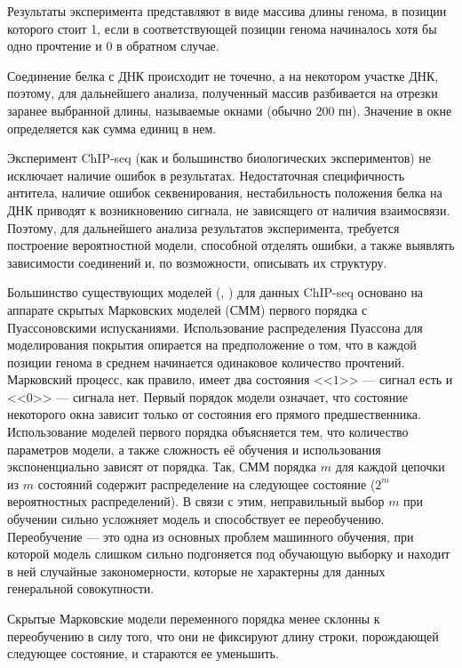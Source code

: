 \documentclass{matmex-diploma-custom}
\begin{document}
Результаты эксперимента представляют в виде массива длины генома, в позиции которого стоит 1, если в соответствующей позиции генома начиналось хотя бы одно прочтение
и 0 в обратном случае.

Соединение белка с ДНК происходит не точечно, а на некотором участке ДНК, поэтому, для дальнейшего анализа, полученный массив разбивается на отрезки заранее выбранной длины, называемые окнами (обычно 200 пн). Значение в окне определяется как сумма единиц в нем. 

Эксперимент ChIP-seq (как и большинство биологических
экспериментов) не исключает наличие ошибок в результатах. Недостаточная специфичность антитела, наличие ошибок секвенирования, нестабильность положения белка на ДНК приводят к возникновению сигнала, не
зависящего от наличия взаимосвязи.
Поэтому, для дальнейшего анализа результатов эксперимента, требуется построение вероятностной модели, способной отделять ошибки, а также 
выявлять зависимости соединений и, по возможности, описывать их структуру.

Большинство существующих моделей (\cite{Zhang2008}, \cite{Spyrou2009}) для данных
ChIP-seq основано на аппарате скрытых Марковских моделей (СММ) 
первого порядка \cite{Rabiner1989} с Пуассоновскими испусканиями. Использование распределения
Пуассона для моделирования покрытия опирается на предположение о том, что в каждой
позиции генома в среднем начинается одинаковое количество прочтений.
Марковский процесс, как правило, имеет два состояния <<$1$>> --- сигнал есть и <<$0$>> --- сигнала нет. Первый порядок модели означает, что состояние некоторого окна зависит только от состояния его прямого предшественника.
Использование моделей первого порядка объясняется тем, что количество параметров
модели, а также сложность её обучения и использования экспоненциально зависят от
порядка. Так, СММ порядка $ m $ для каждой цепочки из $ m $ состояний содержит распределение на следующее состояние ($ 2^m $ вероятностных распределений). В связи с этим, неправильный выбор $ m $ при обучении сильно усложняет модель и способствует ее переобучению. Переобучение --- это одна из основных проблем машинного обучения, при которой модель слишком сильно подгоняется под обучающую выборку и находит в ней случайные закономерности, которые не характерны для данных генеральной совокупности.

Скрытые Марковские модели переменного порядка менее склонны к переобучению в силу того, что они не фиксируют длину строки, порождающей следующее состояние, и стараются ее уменьшить.
\end{document}
